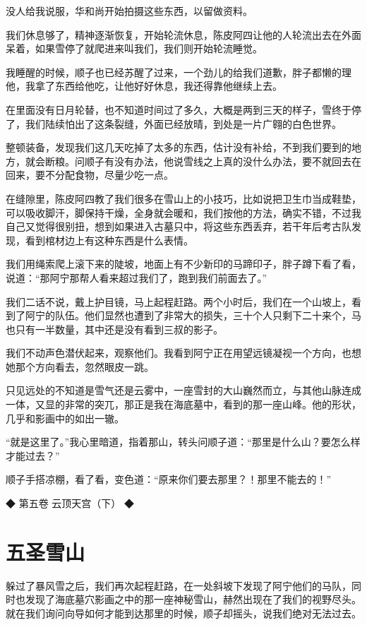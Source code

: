 没人给我说服，华和尚开始拍摄这些东西，以留做资料。

我们休息够了，精神逐渐恢复，开始轮流休息，陈皮阿四让他的人轮流出去在外面呆着，如果雪停了就爬进来叫我们，我们则开始轮流睡觉。

我睡醒的时候，顺子也已经苏醒了过来，一个劲儿的给我们道歉，胖子都懒的理他，我拿了东西给他吃，让他好好休息，我还得靠他继续上去。

在里面没有日月轮替，也不知道时间过了多久，大概是两到三天的样子，雪终于停了，我们陆续怕出了这条裂缝，外面已经放晴，到处是一片广翱的白色世界。

整顿装备，发现我们这几天吃掉了太多的东西，估计没有补给，不到我们要到的地方，就会断粮。问顺子有没有办法，他说雪线之上真的没什么办法，要不就回去在回来，要不分配食物，尽量少吃一点。

在缝隙里，陈皮阿四教了我们很多在雪山上的小技巧，比如说把卫生巾当成鞋垫，可以吸收脚汗，脚保持干燥，全身就会暖和，我们按他的方法，确实不错，不过我自己又觉得很别扭，想到如果进入古墓只中，将这些东西丢弃，若干年后考古队发现，看到棺材边上有这种东西是什么表情。

我们用绳索爬上滚下来的陡坡，地面上有不少新印的马蹄印子，胖子蹲下看了看，说道：“那阿宁那帮人看来超过我们了，跑到我们前面去了。”

我们二话不说，戴上护目镜，马上起程赶路。两个小时后，我们在一个山坡上，看到了阿宁的队伍。他们显然也遭到了非常大的损失，三十个人只剩下二十来个，马也只有一半数量，其中还是没有看到三叔的影子。

我们不动声色潜伏起来，观察他们。我看到阿宁正在用望远镜凝视一个方向，也想她那个方向看去，忽然眼皮一跳。

只见远处的不知道是雪气还是云雾中，一座雪封的大山巍然而立，与其他山脉连成一体，又显的非常的突兀，那正是我在海底墓中，看到的那一座山峰。他的形状，几乎和影画中的如出一辙。

“就是这里了。”我心里暗道，指着那山，转头问顺子道：“那里是什么山？要怎么样才能过去？”

顺子手搭凉棚，看了看，变色道：“原来你们要去那里？！那里不能去的！”

◆ 第五卷 云顶天宫（下） ◆

\chapter{五圣雪山}

躲过了暴风雪之后，我们再次起程赶路，在一处斜坡下发现了阿宁他们的马队，同时也发现了海底墓穴影画之中的那一座神秘雪山，赫然出现在了我们的视野尽头。就在我们询问向导如何才能到达那里的时候，顺子却摇头，说我们绝对无法过去。

